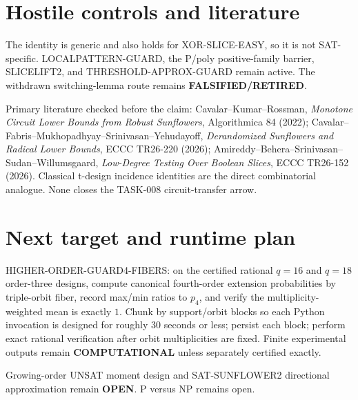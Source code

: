 \documentclass[11pt]{article}
\begin{document}
\section*{Hostile controls and literature}
The identity is generic and also holds for XOR-SLICE-EASY, so it is not SAT-specific. LOCALPATTERN-GUARD, the P/poly positive-family barrier, SLICELIFT2, and THRESHOLD-APPROX-GUARD remain active. The withdrawn switching-lemma route remains \textbf{FALSIFIED/RETIRED}.

Primary literature checked before the claim: Cavalar--Kumar--Rossman, \emph{Monotone Circuit Lower Bounds from Robust Sunflowers}, Algorithmica 84 (2022); Cavalar--Fabris--Mukhopadhyay--Srinivasan--Yehudayoff, \emph{Derandomized Sunflowers and Radical Lower Bounds}, ECCC TR26-220 (2026); Amireddy--Behera--Srinivasan--Sudan--Willumsgaard, \emph{Low-Degree Testing Over Boolean Slices}, ECCC TR26-152 (2026). Classical t-design incidence identities are the direct combinatorial analogue. None closes the TASK-008 circuit-transfer arrow.

\section*{Next target and runtime plan}
HIGHER-ORDER-GUARD4-FIBERS: on the certified rational $q=16$ and $q=18$ order-three designs, compute canonical fourth-order extension probabilities by triple-orbit fiber, record max/min ratios to $p_4$, and verify the multiplicity-weighted mean is exactly $1$. Chunk by support/orbit blocks so each Python invocation is designed for roughly 30 seconds or less; persist each block; perform exact rational verification after orbit multiplicities are fixed. Finite experimental outputs remain \textbf{COMPUTATIONAL} unless separately certified exactly.

Growing-order UNSAT moment design and SAT-SUNFLOWER2 directional approximation remain \textbf{OPEN}. P versus NP remains open.
\end{document}
